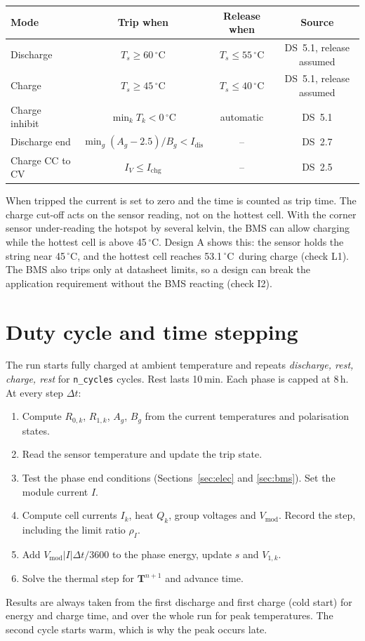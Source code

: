 \documentclass[11pt,a4paper]{article}
\newcommand{\ds}[1]{\textsc{DS}~#1}
\newcommand{\degC}{\ensuremath{{}^{\circ}\mathrm{C}}}
\begin{document}
\begin{center}
\begin{tabular}{@{}lccc@{}}
\toprule
Mode & Trip when & Release when & Source \\
\midrule
Discharge & $T_s\ge60$\,\degC & $T_s\le55$\,\degC & \ds{5.1}, release assumed \\
Charge & $T_s\ge45$\,\degC & $T_s\le40$\,\degC & \ds{5.1}, release assumed \\
Charge inhibit & $\min_k T_k<0$\,\degC & automatic & \ds{5.1} \\
Discharge end & $\min_g (A_g-2.5)/B_g<I_{\mathrm{dis}}$ & -- & \ds{2.7} \\
Charge CC to CV & $I_V\le I_{\mathrm{chg}}$ & -- & \ds{2.5} \\
\bottomrule
\end{tabular}
\end{center}
When tripped the current is set to zero and the time is counted as trip time. The charge cut-off acts on the sensor reading, not on the hottest cell. With the corner sensor under-reading the hotspot by several kelvin, the BMS can allow charging while the hottest cell is above 45\,\degC. Design A shows this: the sensor holds the string near 45\,\degC, and the hottest cell reaches 53.1\,\degC\ during charge (check L1). The BMS also trips only at datasheet limits, so a design can break the application requirement without the BMS reacting (check I2).

\section{Duty cycle and time stepping}\label{sec:cycle}
The run starts fully charged at ambient temperature and repeats \emph{discharge, rest, charge, rest} for \texttt{n\_cycles} cycles. Rest lasts 10\,min. Each phase is capped at 8\,h. At every step $\Delta t$:
\begin{enumerate}
\item Compute $R_{0,k}$, $R_{1,k}$, $A_g$, $B_g$ from the current temperatures and polarisation states.
\item Read the sensor temperature and update the trip state.
\item Test the phase end conditions (Sections~\ref{sec:elec} and \ref{sec:bms}). Set the module current $I$.
\item Compute cell currents $I_k$, heat $Q_k$, group voltages and $V_{\mathrm{mod}}$. Record the step, including the limit ratio $\rho_I$.
\item Add $V_{\mathrm{mod}}|I|\Delta t/3600$ to the phase energy, update $s$ and $V_{1,k}$.
\item Solve the thermal step for $\mathbf{T}^{n+1}$ and advance time.
\end{enumerate}
Results are always taken from the first discharge and first charge (cold start) for energy and charge time, and over the whole run for peak temperatures. The second cycle starts warm, which is why the peak occurs late.
\end{document}
